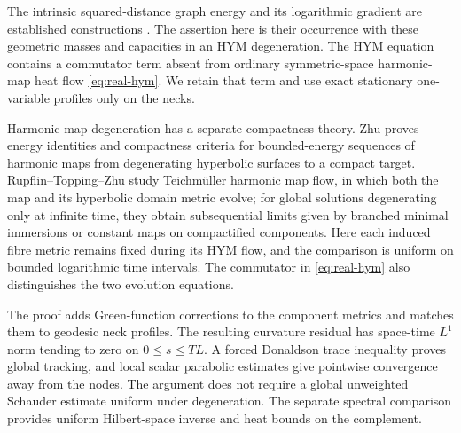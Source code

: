 The intrinsic squared-distance graph energy and its logarithmic
gradient are established constructions \cite{tav}. The assertion here
is their occurrence with these geometric masses and capacities in an
HYM degeneration. The HYM equation contains a commutator term absent
from ordinary symmetric-space harmonic-map heat flow
\eqref{eq:real-hym}. We retain that term and use exact stationary
one-variable profiles only on the necks.

Harmonic-map degeneration has a separate compactness theory.
Zhu \cite{zhu} proves energy identities and compactness criteria for
bounded-energy sequences of harmonic maps from degenerating hyperbolic
surfaces to a compact target. Rupflin--Topping--Zhu \cite{rtz} study
Teichm\"uller harmonic map flow, in which both the map and its hyperbolic
domain metric evolve; for global solutions degenerating only at infinite
time, they obtain subsequential limits given by branched minimal
immersions or constant maps on compactified components. Here each induced
fibre metric remains fixed during its HYM flow, and the comparison is
uniform on bounded logarithmic time intervals. The commutator in
\eqref{eq:real-hym} also distinguishes the two evolution equations.

The proof adds Green-function corrections to the component metrics
and matches them to geodesic neck profiles. The resulting curvature
residual has space-time $L^1$ norm tending to zero on $0\le s\le TL$.
A forced Donaldson trace inequality proves global tracking, and local
scalar parabolic estimates give pointwise convergence away from the
nodes. The argument does not require a global unweighted Schauder
estimate uniform under degeneration. The separate spectral comparison
provides uniform Hilbert-space inverse and heat bounds on the complement.
